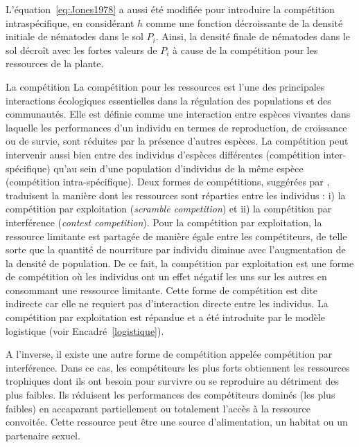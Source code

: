 	L'équation~\eqref{eq:Jones1978} a aussi été modifiée pour introduire la compétition intraspécifique, en considérant $h$ comme une fonction décroissante  de la densité initiale de nématodes dans le sol $P_i$. Ainsi, la densité finale de nématodes dans le sol décroît avec les fortes valeurs de $P_i$ à cause de la compétition pour les ressources de la plante. 
	
	
	\begin{encadre2}{La compétition}
	\label{competition}La compétition pour les ressources est l’une des principales interactions écologiques essentielles dans la régulation des populations et des communautés. Elle est définie comme une interaction entre espèces vivantes dans laquelle les performances d’un individu en termes de reproduction, de croissance ou de survie, sont réduites par la présence d’autres espèces.  La compétition peut intervenir aussi bien entre des individus d’espèces différentes (compétition inter-spécifique) qu’au sein d’une population d’individus de la même espèce (compétition intra-spécifique).  Deux formes de compétitions, suggérées  par \citet{Nicholson1954}, traduisent la manière dont les ressources sont réparties entre les individus : i) la compétition par exploitation (\textit{scramble competition}) et ii) la compétition par interférence   (\textit{contest competition}). Pour la compétition par exploitation, la ressource limitante  est partagée de manière égale entre les compétiteurs, de telle sorte que la quantité de nourriture par individu diminue avec l'augmentation de la densité de population. De ce fait, la compétition par exploitation est  une forme de compétition où les individus ont un effet négatif les uns sur les autres en consommant une ressource limitante.  Cette forme de  compétition est  dite indirecte car elle ne requiert pas d’interaction directe entre les individus.  La compétition par exploitation est répandue et a été introduite par le modèle logistique (voir Encadré~\ref{logistique}).
	 \par\medskip
	  A l’inverse, il existe une autre forme de compétition appelée compétition par interférence.  Dans ce cas,  les compétiteurs les plus forts obtiennent  les ressources trophiques dont ils ont besoin pour survivre ou se reproduire au détriment des plus faibles. Ils réduisent les performances des compétiteurs dominés (les plus faibles)  en accaparant partiellement ou totalement l’accès à la ressource convoitée. Cette ressource peut être une source d’alimentation, un habitat ou un partenaire sexuel.  
	\end{encadre2}
	
